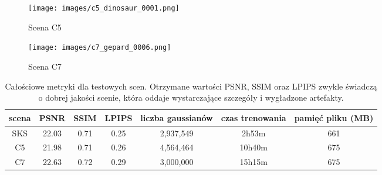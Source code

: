 \begin{figure}[!h]
    \centering
    \texttt{[image: images/c5\_dinosaur\_0001.png]}
    \caption{Scena C5}
    \label{fig:c5_gs}
\end{figure}

\begin{figure}[!h]
    \centering
    \texttt{[image: images/c7\_gepard\_0006.png]}
    \caption{Scena C7}
    \label{fig:c7_gs}
\end{figure}

\begin{table}[!h]
    \centering
    \begin{tabular}{|c|c|c|c|c|c|c|}
    \hline
    scena & PSNR & SSIM & LPIPS & liczba gaussianów & czas trenowania & pamięć pliku (MB) \\
    \hline 
    SKS & 22.03 & 0.71 & 0.25 & 2,937,549 & 2h53m & 661 \\
    \hline 
    C5 & 21.98 & 0.71 & 0.26 & 4,564,464 & 10h40m & 675 \\
    \hline 
    C7 & 22.63 & 0.72 & 0.29 & 3,000,000 & 15h15m & 675 \\
    \hline
    \end{tabular}
\caption{Całościowe metryki dla testowych scen. Otrzymane wartości PSNR, SSIM oraz LPIPS zwykle świadczą o dobrej jakości scenie, która oddaje wystarczające szczegóły i wygładzone artefakty.}
\label{table:tab_conf_sks}
\end{table}